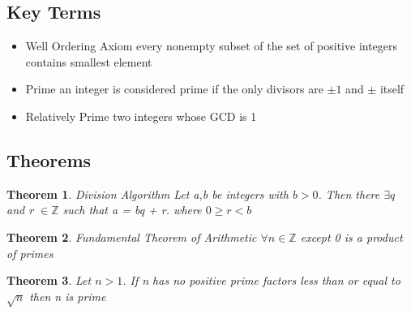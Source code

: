 \documentclass[12pt]{article}
\newtheorem*{theorem*}{Theorem}
\begin{document}
\subsection*{Key Terms}
\begin{itemize}
    \item Well Ordering Axiom \newline 
    every nonempty subset of the set of positive integers contains smallest element 
    \item Prime \newline 
    an integer is considered prime if the only divisors are $\pm 1$ and $\pm$ itself
    \item Relatively Prime \newline 
    two integers whose GCD is 1 
\end{itemize}
\subsection*{Theorems}
\begin{theorem*}
Division Algorithm \newline 
Let a,b be integers with $b > 0$. Then there $\exists q$ and r $\in \mathbb{Z}$ such that a = bq + r. where $0 \geq r < b$
\end{theorem*}
\begin{theorem*}
Fundamental Theorem of Arithmetic \newline 
$\forall n \in \mathbb{Z}$ except 0 is a product of primes
\end{theorem*}
\begin{theorem*}
Let $n > 1$. If n has no positive prime factors less than or equal to $\sqrt{n}$ then n is prime
\end{theorem*}
\end{document}
